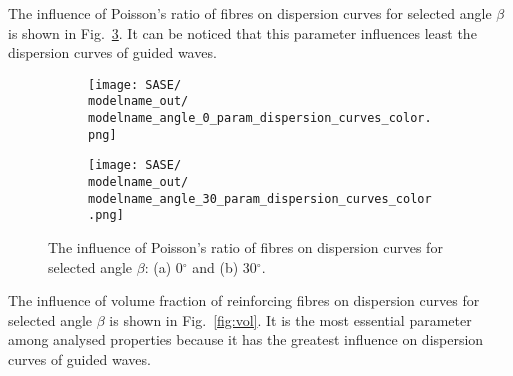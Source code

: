 \documentclass[preprint,12pt]{elsarticle}
\begin{document}
The influence of Poisson's ratio of fibres  on dispersion curves for selected angle 
\(\beta\) is shown in Fig.~\ref{fig:nif}. It can be noticed that this parameter influences 
least the dispersion curves of guided waves.

\begin{figure} [h!]
	\centering
	\newcommand{\modelname}{SASE7_plain_weave}
	\begin{subfigure}[b]{0.49\textwidth}
		\centering
		
		
\texttt{[image: SASE/\\modelname\_out/\\modelname\_angle\_0\_param\_dispersion\_curves\_color.png]}
		\caption{}
		\label{fig:nif0}
	\end{subfigure}
	\hfill
	\begin{subfigure}[b]{0.49\textwidth}
		\centering
		
		
\texttt{[image: SASE/\\modelname\_out/\\modelname\_angle\_30\_param\_dispersion\_curves\_color.png]}
		\caption{}
		\label{fig:nif30}
	\end{subfigure}

	\caption{The influence of Poisson's ratio of fibres on dispersion curves for selected 
	angle \(\beta\): (a) 0\(^{\circ}\) and (b) 30\(^{\circ}\).} 
	\label{fig:nif}
\end{figure}

The influence of volume fraction of reinforcing fibres on dispersion curves for selected 
angle \(\beta\) is shown in Fig.~\ref{fig:vol}. It is the most essential parameter among 
analysed properties because it has the greatest influence on dispersion curves of 
guided waves.
\end{document}
